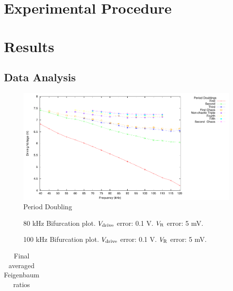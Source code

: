 \documentclass[12pt]{report}
\begin{document}
\chapter{Experimental Procedure}



\chapter{Results}

\section{Data Analysis} %
\label{sec:Data Analysis}

	\begin{figure}[h]
		\centering
		\includegraphics{plots/general.pdf}
		\caption{Period Doubling}
		\label{fig:periodDoubling}
	\end{figure}



	\begin{figure}[h]
		\centering
		
		\caption{80 kHz Bifurcation plot. $V_{\rm drive}$ error: 0.1 V. $V_{\rm R}$ error: 5 mV.}
		\label{fig:80khzBifurcation}
	\end{figure}

	\begin{figure}[h]
		\centering
		
		\caption{100 kHz Bifurcation plot. $V_{\rm drive}$ error: 0.1 V. $V_{\rm R}$ error: 5 mV.}
		\label{fig:100khzBifurcation}
	\end{figure}
	

	
	\begin{table}[h]
		\centering
		\begin{tabular}{|c|c|c|c|c|}
			\hline
			 
		\end{tabular}
		\caption{Final averaged Feigenbaum ratios}
		\label{tab:feigenbaum}
		
	\end{table}
	
\end{document}
